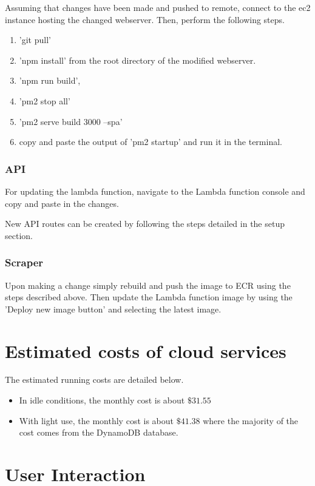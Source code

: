 \documentclass[12pt]{article}
\begin{document}
Assuming that changes have been made and pushed to remote, connect to the ec2 instance hosting the changed webserver. Then, perform the following steps.

\begin{enumerate}
    \item 'git pull'
    \item 'npm install' from the root directory of the modified webserver.
    \item 'npm run build',
    \item 'pm2 stop all'
    \item 'pm2 serve build 3000 --spa' 
    \item copy and paste the output of 'pm2 startup' and run it in the terminal.
\end{enumerate}

\subsubsection{API}

For updating the lambda function, navigate to the Lambda function console and copy and paste in the changes.

New API routes can be created by following the steps detailed in the setup section.

\subsubsection{Scraper}

Upon making a change simply rebuild and push the image to ECR using the steps described above. Then update the Lambda function image by using the 'Deploy new image button' and selecting the latest image.

\section{Estimated costs of cloud services}
The estimated running costs are detailed below.

\begin{itemize}
    \item In idle conditions, the monthly cost is about $\$31.55$
    \item With light use, the monthly cost is about $\$41.38$ where the majority of the cost comes from the DynamoDB database.
\end{itemize}


\section{User Interaction}
\end{document}
